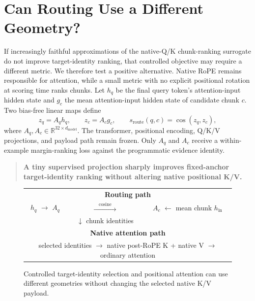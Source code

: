 \documentclass[11pt]{article}
\begin{document}
\section{Can Routing Use a Different Geometry?}
\label{sec:learned-routing}

If increasingly faithful approximations of the native-Q/K chunk-ranking surrogate do not
improve target-identity ranking, that controlled objective may require a different metric.
We therefore test a positive alternative. Native RoPE remains responsible for attention, while
a small metric with no explicit positional rotation at scoring time ranks chunks. Let $h_q$
be the final query token's attention-input hidden state and $g_c$ the mean attention-input
hidden state of candidate chunk $c$. Two bias-free linear maps define
\begin{equation}
 z_q=A_qh_q, \qquad z_c=A_cg_c, \qquad
 s_{\mathrm{route}}(q,c)=\cos(z_q,z_c),
 \label{eq:learned-router}
\end{equation}
where $A_q,A_c\in\mathbb{R}^{32\times d_{\mathrm{model}}}$. The transformer, positional
encoding, Q/K/V projections, and payload path remain frozen. Only $A_q$ and $A_c$ receive a
within-example margin-ranking loss against the programmatic evidence identity.

\begin{quote}
\textbf{A tiny supervised projection sharply improves fixed-anchor target-identity ranking
without altering native positional K/V.}
\end{quote}

\begin{figure}[H]
\centering
\setlength{\fboxsep}{5pt}
\begin{tabular}{c@{\quad}c@{\quad}c}
\multicolumn{3}{c}{\textbf{Routing path}}\\[2pt]
$h_q$ $\rightarrow$ $A_q$ & $\xrightarrow{\quad\mathrm{cosine}\quad}$ &
$A_c$ $\leftarrow$ mean chunk $h_{\mathrm{in}}$\\
& $\downarrow$ chunk identities &\\[5pt]
\multicolumn{3}{c}{\textbf{Native attention path}}\\[2pt]
\multicolumn{3}{c}{selected identities $\rightarrow$ native post-RoPE K + native V
$\rightarrow$ ordinary attention}
\end{tabular}
\caption{Controlled target-identity selection and positional attention can use different
geometries without changing the selected native K/V payload.}
\label{fig:two-geometries}
\end{figure}
\end{document}
